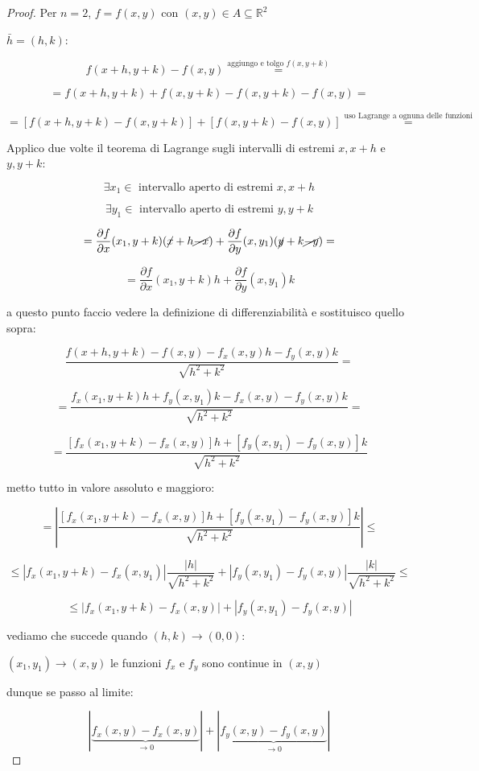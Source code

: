 \documentclass[11pt]{article}
\begin{document}
\begin{proof}
       Per $n=2$, $f = f(x,y)$ con $(x,y) \in A \subseteq \mathbb{R}^{2}$ 

       $\bar{h} = (h,k)$:

       \[
           f(x+h,y+k) - f(x,y) \overset{\text{aggiungo e tolgo $f(x,y+k)$}}{=} 
       \]

       \[
           = f(x+h,y+k) + f(x,y+k) - f(x,y+k) - f(x,y) = 
       \]

       \[
           = [f(x+h,y+k) - f(x,y+k) ] + [f(x,y+k) - f(x,y)] \overset{\text{uso Lagrange a ognuna delle funzioni}}{=}
       \]

       Applico due volte il teorema di Lagrange sugli intervalli di estremi $x,x+h$ e $y,y+k$:

       \[
           \exists x_1 \in  \text{ intervallo aperto di estremi } x,x+h
       \]

       \[
           \exists y_1 \in  \text{ intervallo aperto di estremi } y,y+k
       \]

       \[
           = \frac{\partial f}{\partial x}(x_1,y+k) (\cancel{x} +h \cancel{-x}) + \frac{\partial f}{\partial y}(x,y_1) ( \cancel{y} + k \cancel{-y}) = 
       \]

       \[
           =\frac{\partial f}{\partial x}(x_1,y+k) h + \frac{\partial f}{\partial y}(x,y_1)k 
       \]

       a questo punto faccio vedere la definizione di differenziabilità e sostituisco quello sopra:

       \[
           \frac{f(x+h,y+k) - f(x,y) - f_x(x,y)h - f_y(x,y) k}{\sqrt{h^{2}+k^{2}}} = 
       \]

       \[
           = \frac{f_x(x_1,y+k) h + f_y(x,y_1) k -f_x(x,y) - f_y(x,y) k}{\sqrt{h^{2}+k^{2}}} = 
       \]

       \[
           = \frac{[f_x(x_1,y+k) - f_x(x,y)] h + [f_y(x,y_1) - f_y(x,y)] k}{\sqrt{h^{2}+k^{2}}}
       \]

       metto tutto in valore assoluto e maggioro:

       \[
           = |\frac{[f_x(x_1,y+k) - f_x(x,y)] h + [f_y(x,y_1) - f_y(x,y)] k}{\sqrt{h^{2}+k^{2}}}| \le 
       \]

       \[
       \le |f_x(x_1,y+k) - f_x(x,y_1)| \frac{|h|}{\sqrt{h^{2}+k^{2}}} + | f_y(x,y_1) - f_y(x,y)| \frac{|k|}{\sqrt{h^{2}+k^{2}}} \le 
       \]

       \[
            \le  |f_x(x_1,y+k) - f_x(x,y) | + |f_y(x,y_1) - f_y(x,y) |
       \]

       vediamo che succede quando $(h,k) \rightarrow (0,0)$:

        $(x_1,y_1) \rightarrow (x,y)$ le funzioni $f_x$ e $f_y$ sono continue in $(x,y)$

        dunque se passo al limite:

        \[
            |\underbrace{f_x(x,y) - f_x(x,y)}_\text{$\rightarrow 0$} | + |\underbrace{f_y(x,y) - f_y(x,y)}_\text{$\rightarrow 0$} |
        \]

\end{proof}
\end{document}
